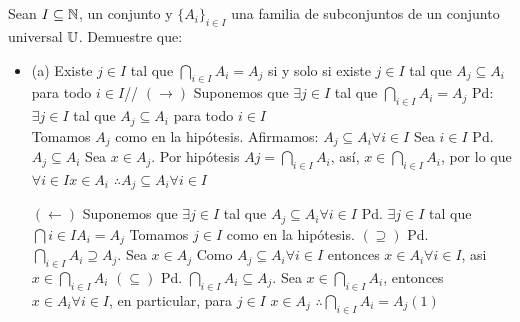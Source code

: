 \section{}
Sean $I \subseteq \mathbb{N}$, un conjunto y $\{A_i\}_{i \in I}$ una familia de subconjuntos de un conjunto universal $\mathbb{U}$. Demuestre que:
\begin{itemize}
	\item (a) Existe $j \in I$ tal que $\bigcap_{i \in I} A_i = A_j$ si y solo si existe $j \in I$ tal que $A_j \subseteq A_i$ para todo  $i \in I$\newline//
	$(\rightarrow)$ Suponemos que $\exists j \in I$ tal que $\bigcap_{i \in I}A_i = A_j$\newline
	Pd: $\exists j \in I$ tal que $A_j \subseteq A_i$ para todo $i \in I$\newline\\
	Tomamos $A_j$ como en la hipótesis.\newline
	Afirmamos: $A_j \subseteq A_i \forall i \in I$\newline
	Sea $i \in I$ Pd. $A_j \subseteq A_i$\newline
	Sea $x \in A_j$. Por hipótesis $Aj = \bigcap_{i \in I}A_i$, así,\newline
	$x \in \bigcap_{i \in I}A_i$, por lo que $\forall i \in I x \in A_i$\newline
	$\therefore A_j \subseteq A_i \forall i \in I$
	
	$(\leftarrow)$ Suponemos que $\exists j \in I$ tal que $A_j \subseteq A_i \forall i \in I$\newline
	Pd. $\exists j \in I$ tal que $\bigcap{i \in I}A_i = A_j$\newline
	Tomamos $j \in I$ como en la hipótesis. \newline
	$(\supseteq)$ Pd. $\bigcap_{i \in I} A_i \supseteq A_j$. Sea $x \in A_j$ Como $A_j \subseteq A_i \forall i \in I$\newline
	entonces $x \in A_i \forall i \in I$, asi $x \in \bigcap_{i \in I}A_i$\newline
	$(\subseteq)$ Pd. $\bigcap_{i \in I}A_i \subseteq A_j$. Sea $x \in \bigcap_{i \in I}A_i$, entonces $x \in A_i \forall i \in I$,\newline
	en particular, para $j \in I$  $x \in A_j$\newline
	$\therefore \bigcap_{i \in I}A_i = A_j (1)$
	

\end{itemize}
